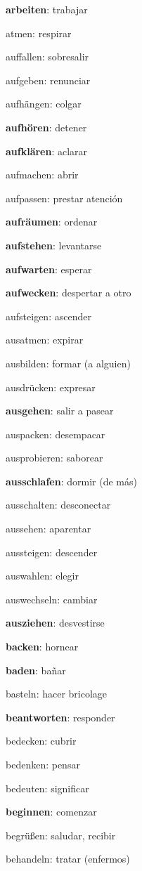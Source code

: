 \begin{multicols}{2}
\begin{myitemize}
\item \textbf{arbeiten}: trabajar
\item atmen: respirar
\item auffallen: sobresalir
\item aufgeben: renunciar
\item aufhängen: colgar
\item \textbf{aufhören}: detener
\item \textbf{aufklären}: aclarar
\item aufmachen: abrir
\item aufpassen: prestar atención
\item \textbf{aufräumen}: ordenar
\item \textbf{aufstehen}: levantarse
\item \textbf{aufwarten}: esperar
\item \textbf{aufwecken}: despertar a otro
\item aufsteigen: ascender
\item ausatmen: expirar
\item ausbilden: formar (a alguien)
\item ausdrücken: expresar
\item \textbf{ausgehen}: salir a pasear
\item auspacken: desempacar
\item ausprobieren: saborear
\item \textbf{ausschlafen}: dormir (de más)
\item ausschalten: desconectar
\item aussehen: aparentar
\item aussteigen: descender
\item auswahlen: elegir
\item auswechseln: cambiar
\item \textbf{ausziehen}: desvestirse
\item \textbf{backen}: hornear
\item \textbf{baden}: bañar
\item basteln: hacer bricolage
\item \textbf{beantworten}: responder
\item bedecken: cubrir
\item bedenken: pensar
\item bedeuten: significar
\item \textbf{beginnen}: comenzar
\item begrüßen: saludar, recibir
\item behandeln: tratar (enfermos)

\end{myitemize}
\end{multicols}
